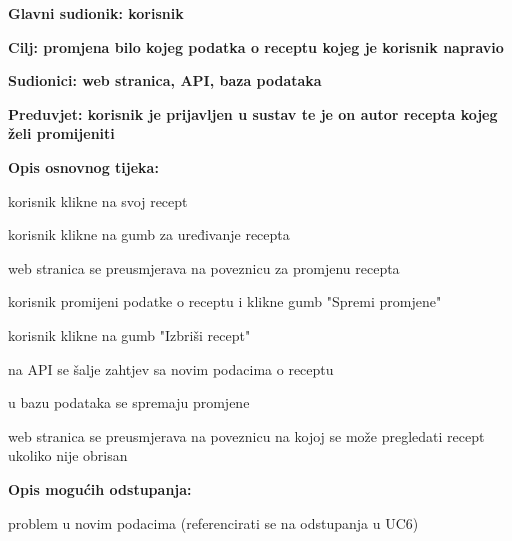 					\noindent {}
					\begin{packed_item}
						\item \textbf{Glavni sudionik: korisnik}
						\item  \textbf{Cilj: promjena bilo kojeg podatka o receptu kojeg je korisnik napravio}
						\item  \textbf{Sudionici: web stranica, API, baza podataka}
						\item  \textbf{Preduvjet: korisnik je prijavljen u sustav te je on autor recepta kojeg želi promijeniti}
						
						\item  \textbf{Opis osnovnog tijeka:}
						\item[] \begin{packed_enum}
							\item korisnik klikne na svoj recept
							\item korisnik klikne na gumb za uređivanje recepta
							\item web stranica se preusmjerava na poveznicu za promjenu recepta
							\item[4.a] korisnik promijeni podatke o receptu i klikne gumb "Spremi promjene"
							\item[4.b] korisnik klikne na gumb "Izbriši recept"
							\item[5.] na API se šalje zahtjev sa novim podacima o receptu
							\item[6.] u bazu podataka se spremaju promjene
							\item[7.] web stranica se preusmjerava na poveznicu na kojoj se može pregledati recept ukoliko nije obrisan
						\end{packed_enum}
						
						\item  \textbf{Opis mogućih odstupanja:}
						\item[] \begin{packed_item}							
							\item[7.a] problem u novim podacima (referencirati se na odstupanja u UC6)
						\end{packed_item}
					\end{packed_item}



